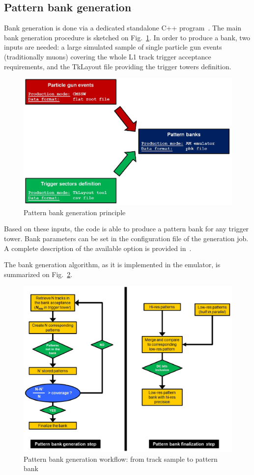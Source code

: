 \subsection{Pattern bank generation}

\noindent Bank generation is done via a dedicated standalone C++ program~\cite{bib:AMEmulator}. The main bank generation procedure is sketched on Fig.~\ref{fig:BkGen}. In order to produce a bank, two inputs are needed: a large simulated sample of single particle gun events (traditionally muons) covering the whole L1 track trigger acceptance requirements, and the TkLayout file providing the trigger towers definition.

\begin{figure}[ht!]
\centering
\includegraphics[width=0.6\columnwidth]{Plots/BankGen.eps}
\caption{Pattern bank generation principle}
\label{fig:BkGen}
\end{figure}

\noindent Based on these inputs, the code is able to produce a pattern bank for any trigger tower. Bank parameters can be set in the configuration file of the generation job. A complete description of the available option is provided in~\cite{bib:AMEmulator}.  

\noindent The bank generation algorithm, as it is implemented in the emulator, is summarized on Fig.~\ref{fig:BkGenDet}.

\begin{figure}[ht!]
\centering
\includegraphics[width=0.6\columnwidth]{Plots/BankGenDetail.eps}
\caption{Pattern bank generation workflow: from track sample to pattern bank}
\label{fig:BkGenDet}
\end{figure}

